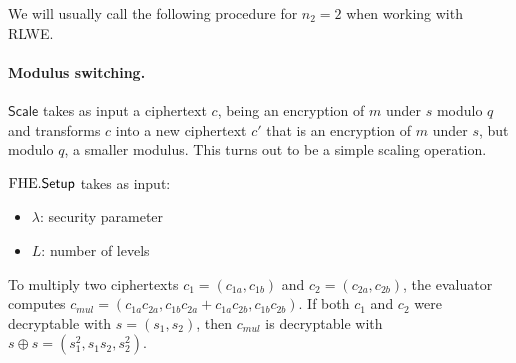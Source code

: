 \documentclass[11pt]{article}
\begin{document}
We will usually call the following procedure for $n_2 =2$ when working with RLWE.





\paragraph{Modulus switching.}
$\mathsf{Scale}$ takes as input a ciphertext $c$, being an encryption of $m$ under $s$ modulo $q$ and transforms $c$ into a new ciphertext $c'$ that is an encryption of $m$ under $s$, but modulo $q$, a smaller modulus. This turns out to be a simple scaling operation. 



 $\mathrm{FHE}\mathsf{.}\mathsf{Setup}$ takes as input:
 \begin{itemize}
 \item $\lambda$: security parameter
 \item $L$: number of levels 
 \end{itemize}


To multiply two ciphertexts $c_1 = (c_{1a}, c_{1b})$ and $c_2 = (c_{2a}, c_{2b})$, the evaluator computes
$c_{mul} = (c_{1a} c_{2a}, c_{1b} c_{2a} + c_{1a} c_{2b}, c_{1b} c_{2b})$. If both $c_1$ and $c_2$ were decryptable with $s = (s_1, s_2)$, then
$c_{mul}$ is decryptable with $s \oplus s = (s_1^2, s_1s_2, s_2^2)$.
\end{document}
